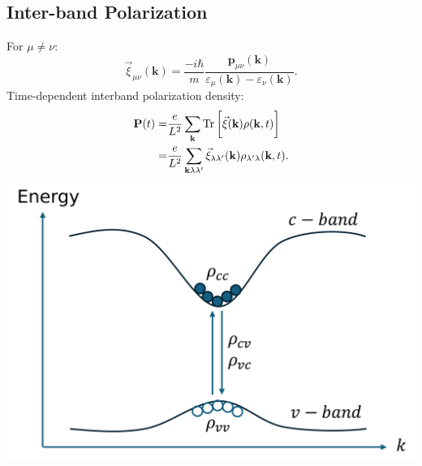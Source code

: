 \documentclass{beamer}
\begin{document}
\subsection{Inter-band Polarization}
\begin{frame}
		\begin{multicols}{2}
For $\mu \neq \nu$:
			\begin{equation}
\vec{\xi}_{\mu\nu}(\textbf{k}) = \frac{-i\hbar}{m}\frac{\textbf{p}_{\mu\nu}(\textbf{k})}{\varepsilon_{\mu}(\textbf{k}) - \varepsilon_{\nu}(\textbf{k})}.
			\end{equation}
Time-dependent interband polarization density:
\begin{align}
\textbf{P}(t) = &\frac{e}{L^2} \sum_{\textbf{k}} \Tr\bigg[\vec{\xi}(\textbf{k})\rho(\textbf{k},t)\bigg]\nonumber\\
= &\frac{e}{L^2} \sum_{\textbf{k}\lambda\lambda'}\vec{\xi}_{\lambda\lambda'}(\textbf{k})\rho_{\lambda'\lambda}(\textbf{k},t).
\end{align}
			\columnbreak
			\includegraphics[width=1\linewidth]{images/cvbeamer.pdf}
		\end{multicols}
	\end{frame}
\end{document}
